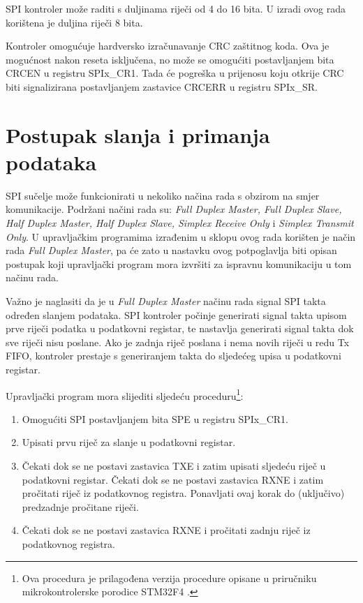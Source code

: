 SPI kontroler može raditi s duljinama riječi od 4 do 16 bita. U izradi ovog rada korištena je duljina riječi 8 bita.

Kontroler omogućuje hardversko izračunavanje CRC zaštitnog koda. Ova je mogućnost nakon reseta isključena, no može se omogućiti postavljanjem bita CRCEN u registru SPIx\_CR1. Tada će pogreška u prijenosu koju otkrije CRC biti signalizirana postavljanjem zastavice CRCERR u registru SPIx\_SR.

\section{Postupak slanja i primanja podataka}

SPI sučelje može funkcionirati u nekoliko načina rada s obzirom na smjer komunikacije. Podržani načini rada su: \textit{Full Duplex Master, Full Duplex Slave, Half Duplex Master, Half Duplex Slave, Simplex Receive Only} i \textit{Simplex Transmit Only}. U upravljačkim programima izrađenim u sklopu ovog rada korišten je način rada \textit{Full Duplex Master}, pa će zato u nastavku ovog potpoglavlja biti opisan postupak koji upravljački program mora izvršiti za ispravnu komunikaciju u tom načinu rada.

Važno je naglasiti da je u \textit{Full Duplex Master} načinu rada signal SPI takta određen slanjem podataka. SPI kontroler počinje generirati signal takta upisom prve riječi podatka u podatkovni registar, te nastavlja generirati signal takta dok sve riječi nisu poslane. Ako je zadnja riječ poslana i nema novih riječi u redu Tx FIFO, kontroler prestaje s generiranjem takta do sljedećeg upisa u podatkovni registar.

Upravljački program mora slijediti sljedeću proceduru\footnote{Ova procedura je prilagođena verzija procedure opisane u priručniku mikrokontrolerske porodice STM32F4 \cite[str.~887]{stm32f4_manual}.}:
\begin{enumerate}
	\item Omogućiti SPI postavljanjem bita SPE u registru SPIx\_CR1.
	\item Upisati prvu riječ za slanje u podatkovni registar.
	\item Čekati dok se ne postavi zastavica TXE i zatim upisati sljedeću riječ u podatkovni registar. Čekati dok se ne postavi zastavica RXNE i zatim pročitati riječ iz podatkovnog registra. Ponavljati ovaj korak do (uključivo) predzadnje pročitane riječi.
	\item  Čekati dok se ne postavi zastavica RXNE i pročitati zadnju riječ iz podatkovnog registra.
\end{enumerate}

